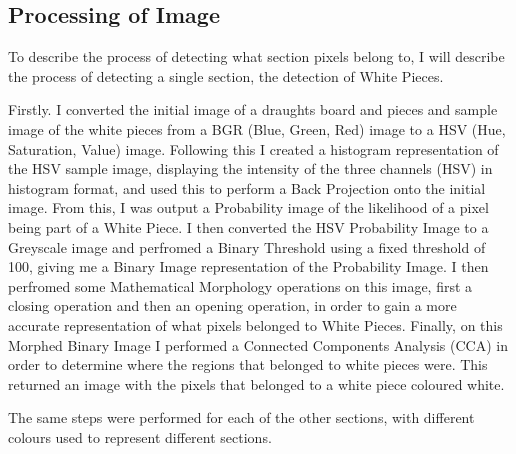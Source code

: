 \documentclass[11pt]{article}
\begin{document}
    \subsection{Processing of Image}
    \par
    To describe the process of detecting what section pixels belong to, I will describe the process of detecting a single section, the detection of White Pieces.
    \par
    Firstly. I converted the initial image of a draughts board and pieces and sample image of the white pieces from a BGR (Blue, Green, Red) image to a HSV (Hue, Saturation, Value) image. 
    Following this I created a histogram representation of the HSV sample image, displaying the intensity of the three channels (HSV) in histogram format, and used this to perform a Back Projection onto the initial image.
    From this, I was output a Probability image of the likelihood of a pixel being part of a White Piece. I then converted the HSV Probability Image to a Greyscale image and perfromed a Binary Threshold using a fixed threshold of 100,
    giving me a Binary Image representation of the Probability Image. I then perfromed some Mathematical Morphology operations on this image, first a closing operation and then an opening operation, in order to gain a more accurate
    representation of what pixels belonged to White Pieces. Finally, on this Morphed Binary Image I performed a Connected Components Analysis (CCA) in order to determine where the regions that belonged to white pieces were.
    This returned an image with the pixels that belonged to a white piece coloured white.
    \par
    The same steps were performed for each of the other sections, with different colours used to represent different sections. 
    \newpage
\end{document}
